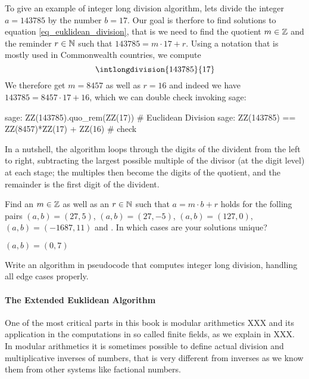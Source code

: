 \begin{example} To give an example of integer long division algorithm, lets divide the integer $a=143785$ by the number $b=17$. Our goal is therfore to find solutions to equation \ref{eq_euklidean_division}, that is we need to find the quotient $m\in\mathbb{Z}$ and the reminder $r \in \mathbb{N}$ such that $143785 = m\cdot 17 + r$. Using a notation that is mostly used in Commonwealth countries, we compute
\begin{equation}
\intlongdivision{143785}{17}
\end{equation}
We therefore get $m=8457$ as well as $r=16$ and indeed we have $143785 = 8457\cdot 17 + 16$, which we can double check invoking sage:
\begin{sagecommandline}
sage: ZZ(143785).quo_rem(ZZ(17)) # Euclidean Division
sage: ZZ(143785) == ZZ(8457)*ZZ(17) + ZZ(16) # check
\end{sagecommandline}
In a nutshell, the algorithm loops through the digits of the divident from the left to right, subtracting the largest possible multiple of the divisor (at the digit level) at each stage; the multiples then become the digits of the quotient, and the remainder is the first digit of the divident.
\end{example}
\begin{exercise}
Find an $m\in\mathbb{Z}$ as well as an $r\in\mathbb{N}$ such that $a= m\cdot b +r$ holds for the folling pairs $(a,b) = (27,5)$, $(a,b)=(27,-5)$, $(a,b)=(127,0)$, $(a,b)= (-1687, 11)$ and . In which cases are your solutions unique?
\end{exercise}$(a,b)= (0, 7)$
\begin{exercise}
Write an algorithm in pseudocode that computes integer long division, handling all edge cases properly.
\end{exercise}

\paragraph{The Extended Euklidean Algorithm}
One of the most critical parts in this book is modular arithmetics XXX and its application in the computations in so called finite fields, as we explain in XXX. In modular arithmetics it is sometimes possible to define actual division and multiplicative inverses of numbers, that is very different from inverses as we know them from other systems like factional numbers. 

